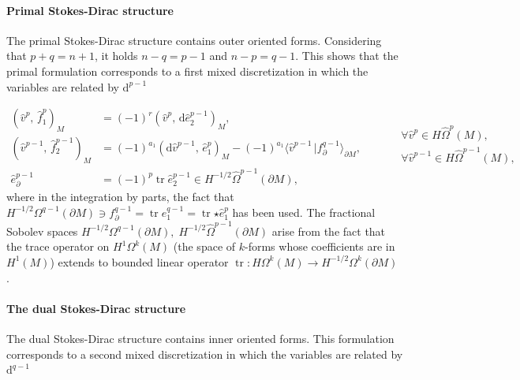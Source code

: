 \documentclass{elsarticle}
\newcommand{\revTwo}[1]{{\color{black}#1}}
\renewcommand\d{\ensuremath{\mathrm{d}}}
\DeclareMathOperator{\tr}{tr}
\newcommand*{\dual}[1]{\ensuremath{\widehat{#1}}}
\newcommand{\inpr}[3][]{\ensuremath{( #2, \, #3 )_{#1}}}
\newcommand{\dualpr}[3][]{\ensuremath{\langle #2 \, \vert #3 \rangle_{#1}}}
\begin{document}
\revTwo{
\paragraph{Primal Stokes-Dirac structure}
The primal Stokes-Dirac structure contains outer oriented forms. Considering that $p+q = n+1$, it holds $n-q=p-1$ and $n-p=q-1$. This shows that the primal formulation corresponds to a first mixed discretization in which the variables are related by $\d^{p-1}$

\begin{equation}\label{eq:primal_SD}
    \begin{aligned}
    \inpr[M]{\dual{v}^p}{\dual{f}^p_1} &= (-1)^r\inpr[M]{\dual{v}^p}{\d \dual{e}^{p-1}_2}, \\
      \inpr[M]{\dual{v}^{p-1}}{\dual{f}^{p-1}_2} &= (-1)^{a_1} \inpr[M]{\d\dual{v}^{p-1}}{\dual{e}^p_1} - (-1)^{a_1} \dualpr[\partial M]{\dual{v}^{p-1}}{f_\partial^{q-1}}, \\
      \dual{e}_\partial^{p-1} &= (-1)^p \tr \dual{e}_2^{p-1} \in H^{-1/2}\dual{\Omega}^{p-1}(\partial M),
    \end{aligned} \qquad
    \begin{aligned}
    &\forall \dual{v}^p \in H\dual{\Omega}^p(M), \\
    &\forall \dual{v}^{p-1} \in H\dual{\Omega}^{p-1}(M),\\
    &
    \end{aligned}
\end{equation}
where in the integration by parts, the fact that $H^{-1/2}{\Omega}^{q-1}(\partial M) \ni f_\partial^{q-1} = \tr e_1^{q-1} = \tr {\star \dual{e}_1^p}$ has been used. The fractional Sobolev spaces $H^{-1/2}{\Omega}^{q-1}(\partial M), \; H^{-1/2}\dual{\Omega}^{p-1}(\partial M)$ arise from the fact that the trace operator on $H^1\Omega^k(M)$ (the space  of $k$-forms whose coefficients are in $H^1(M)$) extends to bounded linear operator $\tr: H\Omega^k(M) \rightarrow H^{-1/2}\Omega^{k}(\partial M)$ \cite[Theorem 6.3]{arnold2018finite}.


\paragraph{The dual Stokes-Dirac structure}
The dual Stokes-Dirac structure contains inner oriented forms. This formulation corresponds to a second mixed discretization in which the variables are related by $\d^{q-1}$ 

}
\end{document}
